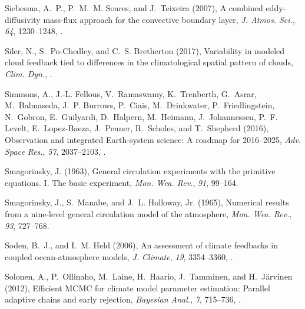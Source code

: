 \documentclass[draft]{agujournal}
\begin{document}
\begin{thebibliography}{196}
Siebesma, A.~P., P.~M.~M. Soares, and J.~Teixeira (2007), A combined
  eddy-diffusivity mass-flux approach for the convective boundary layer,
  \textit{J. Atmos. Sci.}, \textit{64}, 1230--1248, .

Siler, N., S.~Po-Chedley, and C.~S. Bretherton (2017), Variability in modeled
  cloud feedback tied to differences in the climatological spatial pattern of
  clouds, \textit{Clim. Dyn.}, .

Simmons, A., J.-L. Fellous, V.~Ramaswamy, K.~Trenberth, G.~Asrar, M.~Balmaseda,
  J.~P. Burrows, P.~Ciais, M.~Drinkwater, P.~Friedlingstein, N.~Gobron,
  E.~Guilyardi, D.~Halpern, M.~Heimann, J.~Johannessen, P.~F. Levelt,
  E.~Lopez-Baeza, J.~Penner, R.~Scholes, and T.~Shepherd (2016), Observation
  and integrated {E}arth-system science: A roadmap for 2016--2025, \textit{Adv.
  Space Res.}, \textit{57}, 2037--2103, .

Smagorinsky, J. (1963), General circulation experiments with the primitive
  equations. {I.} {T}he basic experiment, \textit{Mon. Wea. Rev.}, \textit{91},
  99--164.

Smagorinsky, J., S.~Manabe, and J.~L. Holloway, Jr. (1965), Numerical results
  from a nine-level general circulation model of the atmosphere, \textit{Mon.
  Wea. Rev.}, \textit{93}, 727--768.

Soden, B.~J., and I.~M. Held (2006), An assessment of climate feedbacks in
  coupled ocean-atmosphere models, \textit{J. Climate}, \textit{19},
  3354--3360, .

Solonen, A., P.~Ollinaho, M.~Laine, H.~Haario, J.~Tamminen, and H.~J{\"a}rvinen
  (2012), Efficient {MCMC} for climate model parameter estimation: Parallel
  adaptive chains and early rejection, \textit{Bayesian Anal.}, \textit{7},
  715--736, .


\end{thebibliography}
\end{document}
